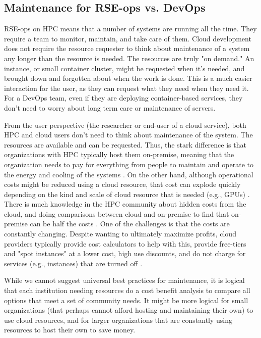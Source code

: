 \subsection{Maintenance for RSE-ops vs. DevOps}


RSE-ops on HPC means that a number of systems are running all the time. They require a team to monitor, maintain, and take care of them. Cloud development does not require the resource requester to think about maintenance of a system any longer than the resource is needed. The resources are truly "on demand." An instance, or small container cluster, might be requested when it's needed, and brought down and forgotten about when the work is done. This is a much easier interaction for the user, as they can request what they need when they need it. For a DevOps team, even if they are deploying container-based services, they don't need to worry about long term care or maintenance of servers.

From the user perspective (the researcher or end-user of a cloud service), both HPC and cloud users don't need to think about maintenance of the system. The resources are available and can be requested. Thus, the stark difference is that organizations with HPC typically host them on-premise, meaning that the organization needs to pay for everything from people to maintain and operate to the energy and cooling of the systems \cite{Carlyle2010-ga}. On the other hand, although operational costs might be reduced using a cloud resource, that cost can explode quickly depending on the kind and scale of cloud resource that is needed (e.g., GPUs) \cite{Li2020-lm}. There is much knowledge in the HPC community about hidden costs from the cloud, and doing comparisons between cloud and on-premise to find that on-premise can be half the costs \cite{Morgan2021-em, nersc-cloud-study}. One of the challenges is that the costs are constantly changing. Despite wanting to ultimately maximize profits, cloud providers typically provide cost calculators to help with this, provide free-tiers and "spot instances" at a lower cost, high use discounts, and do not charge for services (e.g., instances) that are turned off \cite{Power2018-ru}.

While we cannot suggest universal best practices for maintenance, it is logical that each institution needing resources do a cost benefit analysis to compare all options that meet a set of community needs. It might be more logical for small organizations (that perhaps cannot afford hosting and maintaining their own) to use cloud resources, and for larger organizations that are constantly using resources to host their own to save money.
